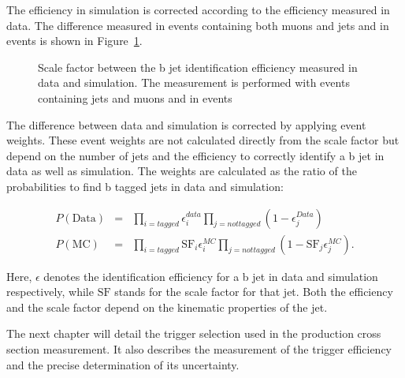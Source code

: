 The efficiency in simulation is corrected according to the efficiency measured in data. The difference measured in events containing both muons and jets and in \ttbar events is shown in Figure~\ref{fig:reco_btagsf}.

\begin{figure}[htbp!]
  \begin{center}
\caption{Scale factor between the b jet identification efficiency measured in data and simulation. The measurement is performed with events containing jets and muons and in \ttbar events~\cite{CMS-DP-2017-012}
  \label{fig:reco_btagsf}}
  \end{center}
\end{figure}

The difference between data and simulation is corrected by applying event weights. These event weights are not calculated directly from the scale factor but depend on the number of jets and the
efficiency to correctly identify a b jet in data as well as simulation.
The weights are calculated as the ratio of the probabilities to find b tagged jets in data and simulation:

\begin{eqnarray}
P(\mathrm{Data}) & = &\prod_{i=tagged} \epsilon_i^{data} \prod_{j=not tagged} (1-\epsilon_j^{Data}) \\
P(\mathrm{MC})& = &\prod_{i=tagged} \mathrm{SF}_i\epsilon_i^{MC} \prod_{j=not tagged} (1-\mathrm{SF}_j\epsilon_j^{MC}).
\end{eqnarray}

Here, $\epsilon$ denotes the identification efficiency for a b jet in data and simulation respectively, while $\mathrm{SF}$ stands for the scale factor for that jet.
Both the efficiency and the scale factor depend on the kinematic properties of the jet.

The next chapter will detail the trigger selection used in the \ttbar production cross section measurement. It also describes the measurement of the trigger
efficiency and the precise determination of its uncertainty.